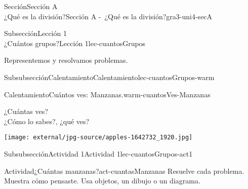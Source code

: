 \begin{sectionptx}{Sección}{{\Large Sección A\\}¿Qué es la división?}{}{Sección A -~¿Qué es la división?}{}{}{gra3-uni4-secA}
%
%
\typeout{************************************************}
\typeout{************************************************}
%
\begin{subsectionptx}{Subsección}{{\normalsize Lección 1\\[-0.05cm]}¿Cuántos grupos?}{}{Lección 1}{}{}{lec-cuantosGrupos}
\begin{introduction}{}%
Representemos y resolvamos problemas.%
\end{introduction}%
%
%
\typeout{************************************************}
\typeout{************************************************}
%
\begin{subsubsectionptx}{Subsubsección}{Calentamiento}{}{Calentamiento}{}{}{lec-cuantosGrupos-warm}
\begin{exploration}{Calentamiento}{Cuántos ves: Manzanas.}{warm-cuantosVes-Manzanas}%
\begin{sidebyside}{2}{0.0}{0.0}{0.05}%
\begin{sbspanel}{0.4}%
¿Cuántas ves?\\
 ¿Cómo lo sabes?, ¿qué ves?%
\end{sbspanel}%
\begin{sbspanel}{0.55}%
\begin{image}{0}{1}{0}{}%
\texttt{[image: external/jpg-source/apples-1642732\_1920.jpg]}
\end{image}%
\end{sbspanel}%
\end{sidebyside}%
\end{exploration}%
%
\end{subsubsectionptx}
%
%
\typeout{************************************************}
\typeout{************************************************}
%
\begin{subsubsectionptx}{Subsubsección}{Actividad 1}{}{Actividad 1}{}{}{lec-cuantosGrupos-act1}
\begin{activity}{Actividad}{¿Cuántas manzanas?}{act-cuantasManzanas}%
Resuelve cada problema. Muestra cómo pensaste. Usa objetos, un dibujo o un diagrama.%
\par

\end{activity}
\end{subsubsectionptx}
\end{subsectionptx}
\end{sectionptx}
